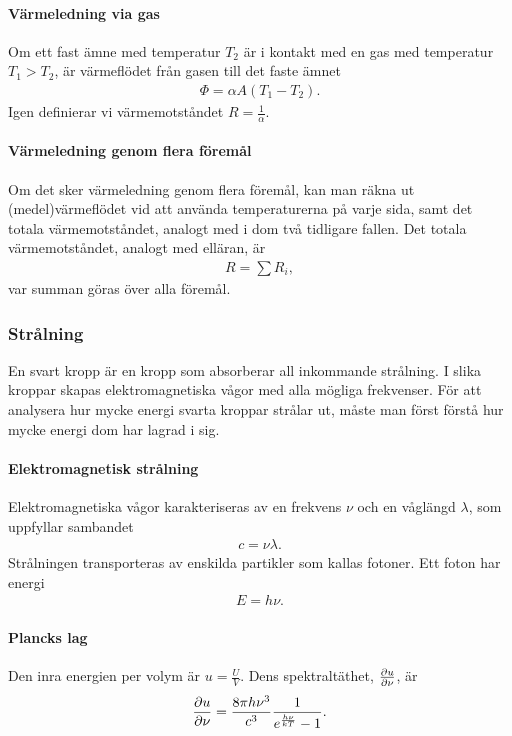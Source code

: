 \paragraph{Värmeledning via gas}
Om ett fast ämne med temperatur $T_2$ är i kontakt med en gas med temperatur $T_1 > T_2$, är värmeflödet från gasen till det faste ämnet
\begin{align*}
	\Phi = \alpha A(T_1 - T_2).
\end{align*}
Igen definierar vi värmemotståndet $R = \frac{1}{\alpha}$.

\paragraph{Värmeledning genom flera föremål}
Om det sker värmeledning genom flera föremål, kan man räkna ut (medel)värmeflödet vid att använda temperaturerna på varje sida, samt det totala värmemotståndet, analogt med i dom två tidligare fallen. Det totala värmemotståndet, analogt med elläran, är
\begin{align*}
	R = \sum R_i,
\end{align*}
var summan göras över alla föremål.

\subsubsection{Strålning}
En svart kropp är en kropp som absorberar all inkommande strålning. I slika kroppar skapas elektromagnetiska vågor med alla mögliga frekvenser. För att analysera hur mycke energi svarta kroppar strålar ut, måste man först förstå hur mycke energi dom har lagrad i sig.

\paragraph{Elektromagnetisk strålning}
Elektromagnetiska vågor karakteriseras av en frekvens $\nu$ och en våglängd $\lambda$, som uppfyllar sambandet
\begin{align*}
	c = \nu\lambda.
\end{align*}
Strålningen transporteras av enskilda partikler som kallas fotoner. Ett foton har energi
\begin{align*}
	E = h\nu.
\end{align*}

\paragraph{Plancks lag}
Den inra energien per volym är $u = \frac{U}{V}$. Dens spektraltäthet, $\pdv{u}{\nu}$, är
\begin{align*}
	\pdv{u}{\nu} = \frac{8\pi h\nu^3}{c^3}\frac{1}{e^{\frac{h\nu}{kT}} - 1}.
\end{align*}

